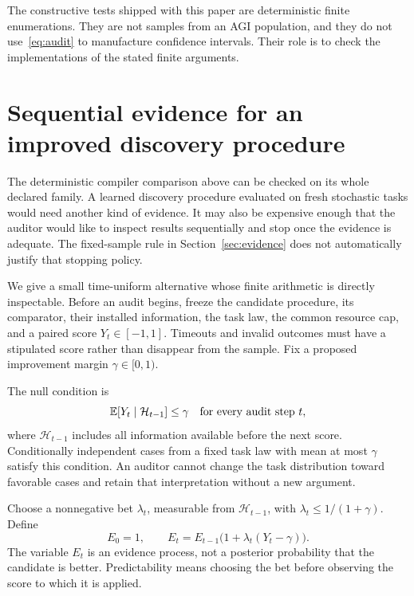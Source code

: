 \documentclass[11pt,letterpaper]{article}
\theoremstyle{plain}
\theoremstyle{definition}
\begin{document}
The constructive tests shipped with this paper are deterministic finite enumerations. They are not samples from an AGI population, and they do not use~\eqref{eq:audit} to manufacture confidence intervals. Their role is to check the implementations of the stated finite arguments.

\section{Sequential evidence for an improved discovery procedure}\label{sec:anytime}
The deterministic compiler comparison above can be checked on its whole declared family. A learned discovery procedure evaluated on fresh stochastic tasks would need another kind of evidence. It may also be expensive enough that the auditor would like to inspect results sequentially and stop once the evidence is adequate. The fixed-sample rule in Section~\ref{sec:evidence} does not automatically justify that stopping policy.

We give a small time-uniform alternative whose finite arithmetic is directly inspectable. Before an audit begins, freeze the candidate procedure, its comparator, their installed information, the task law, the common resource cap, and a paired score $Y_t\in[-1,1]$. Timeouts and invalid outcomes must have a stipulated score rather than disappear from the sample. Fix a proposed improvement margin $\gamma\in[0,1)$.

The null condition is
\begin{equation}\label{eq:anytime-null}
\mathbb E[Y_t\mid\mathcal H_{t-1}]\leq\gamma
\quad\text{for every audit step }t,
\end{equation}
where $\mathcal H_{t-1}$ includes all information available before the next score. Conditionally independent cases from a fixed task law with mean at most $\gamma$ satisfy this condition. An auditor cannot change the task distribution toward favorable cases and retain that interpretation without a new argument.

Choose a nonnegative bet $\lambda_t$, measurable from $\mathcal H_{t-1}$, with $\lambda_t\leq1/(1+\gamma)$. Define
\begin{equation}\label{eq:anytime-capital}
E_0=1,\qquad E_t=E_{t-1}\bigl(1+\lambda_t(Y_t-\gamma)\bigr).
\end{equation}
The variable $E_t$ is an evidence process, not a posterior probability that the candidate is better. Predictability means choosing the bet before observing the score to which it is applied.
\end{document}
